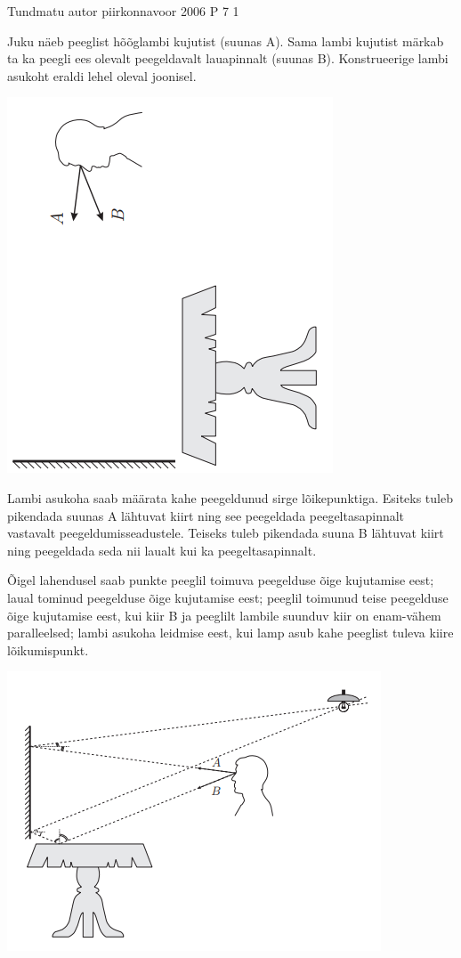 {Tundmatu autor} %
{piirkonnavoor} %
{2006} %
{P 7} %
{1} %
{
\ifStatement
Juku näeb peeglist hõõglambi kujutist (suunas A). Sama lambi kujutist märkab ta ka peegli ees olevalt peegeldavalt lauapinnalt (suunas B). Konstrueerige lambi asukoht eraldi lehel oleval joonisel.
\begin{center}
	\includegraphics[width=0.5\linewidth]{2006-v2p-07-yl.PNG}
\end{center}
\fi

\ifHint
Lambi asukoha saab määrata kahe peegeldunud sirge lõikepunktiga. Esiteks tuleb pikendada suunas A lähtuvat kiirt ning see peegeldada peegeltasapinnalt vastavalt peegeldumisseadustele. Teiseks tuleb pikendada suuna B lähtuvat kiirt ning peegeldada seda nii laualt kui ka peegeltasapinnalt.
\fi


\ifSolution
Õigel lahendusel saab punkte peeglil toimuva peegelduse õige kujutamise eest; laual tominud peegelduse õige kujutamise eest; peeglil toimunud teise peegelduse õige kujutamise eest, kui kiir B ja peeglilt lambile suunduv kiir on enam-vähem paralleelsed; lambi asukoha leidmise eest, kui lamp asub kahe peeglist tuleva kiire lõikumispunkt.
\begin{center}
	\includegraphics[width=0.5\linewidth]{2006-v2p-07-lah.PNG}
\end{center}
\fi
}
